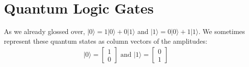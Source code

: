 \documentclass[12pt,twoside]{reedthesis}
\theoremstyle{definition}
\newcommand{\ketz}{\ensuremath{\lvert 0\rangle}\xspace}
\newcommand{\keto}{\ensuremath{\lvert 1\rangle}\xspace}
\begin{document}
\section{Quantum Logic Gates}

As we already glossed over, $\ketz = 1 \ketz + 0  \keto$ and $\keto = 0 \ketz + 1 \keto$. We sometimes represent these quantum states as column vectors of the amplitudes: 
\begin{align*}
\ketz = \begin{bmatrix}
1\\
0
\end{bmatrix}
\text{ and }
\keto = \begin{bmatrix}
0\\
1
\end{bmatrix}
\end{align*}
\end{document}
